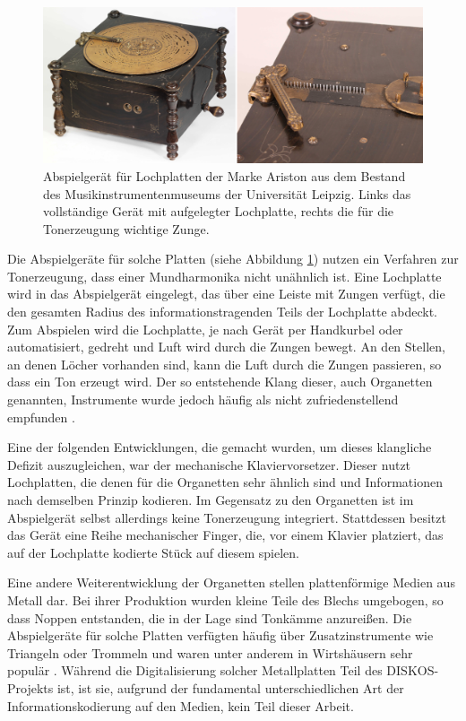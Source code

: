 \begin{figure}[t]
    \centering
    \includegraphics[width=\textwidth]{graphics/ariston_playback_device.png}
    \caption{Abspielgerät für Lochplatten der Marke Ariston aus dem Bestand des Musikinstrumentenmuseums der Universität Leipzig. Links das vollständige Gerät mit aufgelegter Lochplatte, rechts die für die Tonerzeugung wichtige Zunge.}
    \label{aristonplayer}
\end{figure}

Die Abspielgeräte für solche Platten (siehe Abbildung \ref{aristonplayer}) nutzen ein Verfahren zur Tonerzeugung, dass einer Mundharmonika nicht unähnlich ist.
Eine Lochplatte wird in das Abspielgerät eingelegt, das über eine Leiste mit Zungen verfügt, die den gesamten Radius des informationstragenden Teils der Lochplatte abdeckt.
Zum Abspielen wird die Lochplatte, je nach Gerät per Handkurbel oder automatisiert, gedreht und Luft wird durch die Zungen bewegt.
An den Stellen, an denen Löcher vorhanden sind, kann die Luft durch die Zungen passieren, so dass ein Ton erzeugt wird.
Der so entstehende Klang dieser, auch Organetten genannten, Instrumente wurde jedoch häufig als nicht zufriedenstellend empfunden \parencite[III.5.c. Plattenspieldosen und Drehinstrumente]{mgg_mechanische}.

Eine der folgenden Entwicklungen, die gemacht wurden, um dieses klangliche Defizit auszugleichen, war der mechanische Klaviervorsetzer.
Dieser nutzt Lochplatten, die denen für die Organetten sehr ähnlich sind und Informationen nach demselben Prinzip kodieren.
Im Gegensatz zu den Organetten ist im Abspielgerät selbst allerdings keine Tonerzeugung integriert.
Stattdessen besitzt das Gerät eine Reihe mechanischer Finger, die, vor einem Klavier platziert, das auf der Lochplatte kodierte Stück auf diesem spielen.

Eine andere Weiterentwicklung der Organetten stellen plattenförmige Medien aus Metall dar.
Bei ihrer Produktion wurden kleine Teile des Blechs umgebogen, so dass Noppen entstanden, die in der Lage sind Tonkämme anzureißen.
Die Abspielgeräte für solche Platten verfügten häufig über Zusatzinstrumente wie Triangeln oder Trommeln und waren unter anderem in Wirtshäusern sehr populär \parencite[III.5.c. Plattenspieldosen und Drehinstrumente]{mgg_mechanische}.
Während die Digitalisierung solcher Metallplatten Teil des DISKOS-Projekts ist, ist sie, aufgrund der fundamental unterschiedlichen Art der Informationskodierung auf den Medien, kein Teil dieser Arbeit.

